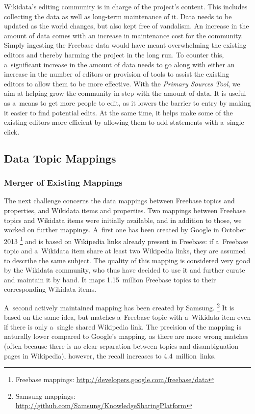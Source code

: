 \documentclass{sig-alternate-2013}
\begin{document}
Wikidata's editing community is in charge of the project's content. This includes collecting the
data as well as long-term maintenance of it. Data needs to be updated as the world changes, but also
kept free of vandalism. An increase in the amount of data comes with an increase in maintenance
cost for the community. Simply ingesting the Freebase data would have meant overwhelming the
existing editors and thereby harming the project in the long run. To counter this, a~significant
increase in the amount of data needs to go along with either an increase in the number of editors
or provision of tools to assist the existing editors to allow them to be more effective. With the
\emph{Primary Sources Tool}, we aim at helping grow the community in step with the amount of data. It is
useful as a~means to get more people to edit, as it lowers the barrier to entry by
making it easier to find potential edits. At the same time, it helps make some of the existing
editors more efficient by allowing them to add statements with a~single click.

\subsection{Data Topic Mappings}\label{subsec:topic-mappings}

\subsubsection{Merger of Existing Mappings}

The next challenge concerns the data mappings between Freebase topics and properties,
and Wikidata items and properties.
Two mappings between Freebase topics and Wikidata items were initially available,
and in addition to those, we worked on further mappings.
A~first one has been created by Google in October 2013%
\footnote{Freebase mappings: \url{http://developers.google.com/freebase/data}}
and is based on Wikipedia links already present in Freebase: if a~Freebase topic and
a~Wikidata item share at least two Wikipedia links, they are assumed to describe the same subject.
The quality of this mapping is considered very good by the Wikidata community,
who thus have decided to use it and further curate and maintain it by hand.
It maps 1.15~million Freebase topics to their corresponding Wikidata items.

A~second actively maintained mapping has been created by Samsung.%
\footnote{Samsung mappings: \url{http://github.com/Samsung/KnowledgeSharingPlatform}}
It is based on the same idea, but matches a~Freebase topic with a~Wikidata item
even if there is only a~single shared Wikipedia link.
The precision of the mapping is naturally lower compared to Google's mapping,
as there are more wrong matches (often because there is no clear separation between topics
and disambiguation pages in Wikipedia), however, the recall increases to 4.4~million~links.
\end{document}
